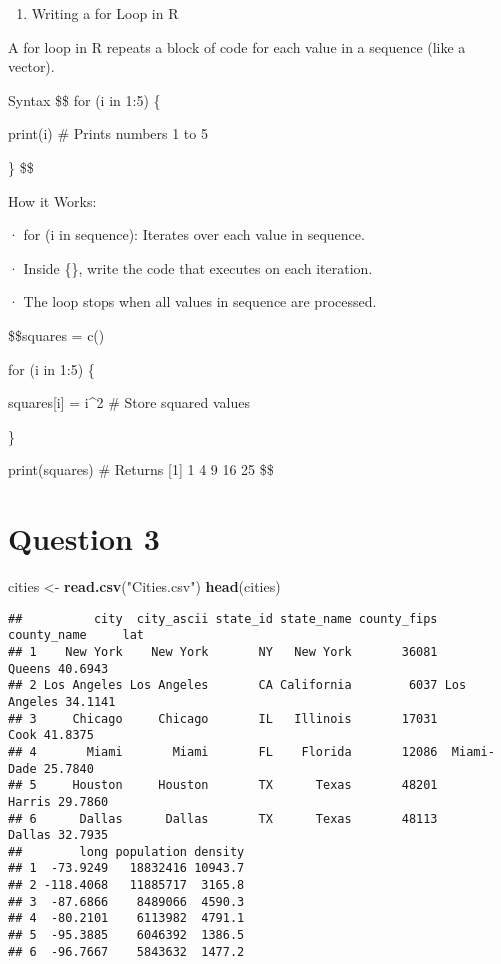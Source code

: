 \documentclass[
]{article}
\newenvironment{Shaded}{\begin{snugshade}}{\end{snugshade}}
\newcommand{\FunctionTok}[1]{\textcolor[rgb]{0.13,0.29,0.53}{\textbf{#1}}}
\newcommand{\NormalTok}[1]{#1}
\newcommand{\OtherTok}[1]{\textcolor[rgb]{0.56,0.35,0.01}{#1}}
\newcommand{\StringTok}[1]{\textcolor[rgb]{0.31,0.60,0.02}{#1}}
\providecommand{\tightlist}{%
  \setlength{\itemsep}{0pt}\setlength{\parskip}{0pt}}
\begin{document}
\begin{enumerate}
\def\labelenumi{(\Alph{enumi})}
\setcounter{enumi}{1}
\tightlist
\item
  Writing a for Loop in R
\end{enumerate}

A for loop in R repeats a block of code for each value in a sequence
(like a vector).

Syntax \$\$ for (i in 1:5) \{

print(i) \# Prints numbers 1 to 5

\} \$\$

How it Works:

· for (i in sequence): Iterates over each value in sequence.

· Inside \{\}, write the code that executes on each iteration.

· The loop stops when all values in sequence are processed.

\$\$squares = c()

for (i in 1:5) \{

squares{[}i{]} = i\^{}2 \# Store squared values

\}

print(squares) \# Returns {[}1{]} 1 4 9 16 25 \$\$

\section{Question 3}\label{question-3}

\begin{Shaded}
\begin{Highlighting}[]
\NormalTok{cities }\OtherTok{\textless{}{-}} \FunctionTok{read.csv}\NormalTok{(}\StringTok{"Cities.csv"}\NormalTok{)}
\FunctionTok{head}\NormalTok{(cities)}
\end{Highlighting}
\end{Shaded}

\begin{verbatim}
##          city  city_ascii state_id state_name county_fips county_name     lat
## 1    New York    New York       NY   New York       36081      Queens 40.6943
## 2 Los Angeles Los Angeles       CA California        6037 Los Angeles 34.1141
## 3     Chicago     Chicago       IL   Illinois       17031        Cook 41.8375
## 4       Miami       Miami       FL    Florida       12086  Miami-Dade 25.7840
## 5     Houston     Houston       TX      Texas       48201      Harris 29.7860
## 6      Dallas      Dallas       TX      Texas       48113      Dallas 32.7935
##        long population density
## 1  -73.9249   18832416 10943.7
## 2 -118.4068   11885717  3165.8
## 3  -87.6866    8489066  4590.3
## 4  -80.2101    6113982  4791.1
## 5  -95.3885    6046392  1386.5
## 6  -96.7667    5843632  1477.2
\end{verbatim}
\end{document}
